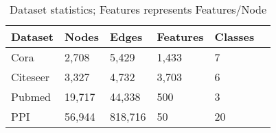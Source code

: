 \begin{table}
    \centering
    \begin{tabular}{@{}llllll@{}}
        \toprule
        \textbf{Dataset}&\textbf{Nodes}&\textbf{Edges}&\textbf{Features}&\textbf{Classes}\\
        \midrule
        Cora     & 2,708   & 5,429   & 1,433 & 7 \\
        Citeseer & 3,327   & 4,732   & 3,703 & 6 \\
        Pubmed   & 19,717  & 44,338  & 500   & 3 \\
        PPI      & 56,944  & 818,716 & 50    & 20 \\
        \bottomrule
    \end{tabular}
    \caption{Dataset statistics; Features represents Features/Node}
    \label{tab:dataset_stats}

\end{table}




